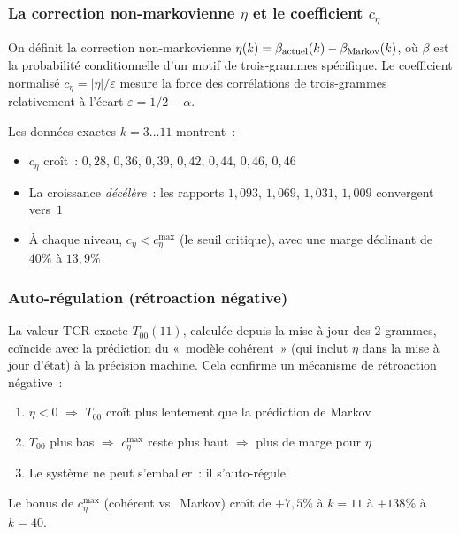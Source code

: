 \documentclass[12pt,a4paper]{article}
\begin{document}
\subsubsection{La correction non-markovienne $\eta$ et le coefficient $c_\eta$}

On définit la correction non-markovienne
$\eta(k) = \beta_{\rm actuel}(k) - \beta_{\rm Markov}(k)$, où
$\beta$ est la probabilité conditionnelle d'un motif de
trois-grammes spécifique. Le coefficient normalisé
$c_\eta = |\eta|/\varepsilon$ mesure la force des corrélations de
trois-grammes relativement à l'écart
$\varepsilon = 1/2 - \alpha$.

Les données exactes $k = 3\ldots 11$ montrent~:
\begin{itemize}[nosep]
\item $c_\eta$ croît~: $0{,}28$, $0{,}36$, $0{,}39$, $0{,}42$,
  $0{,}44$, $0{,}46$, $0{,}46$
\item La croissance \emph{décélère}~: les rapports
  $1{,}093$, $1{,}069$, $1{,}031$, $1{,}009$ convergent vers~$1$
\item À chaque niveau, $c_\eta < c_\eta^{\max}$ (le seuil critique),
  avec une marge déclinant de $40\%$ à $13{,}9\%$
\end{itemize}

\subsubsection{Auto-régulation (rétroaction négative)}
\label{sec:ch7b_auto}

La valeur TCR-exacte $T_{00}(11)$, calculée depuis la mise à jour des
2-grammes, coïncide avec la prédiction du «~modèle cohérent~» (qui
inclut $\eta$ dans la mise à jour d'état) à la précision machine. Cela
confirme un mécanisme de rétroaction négative~:

\begin{enumerate}[nosep]
\item $\eta < 0$ $\Rightarrow$ $T_{00}$ croît plus lentement que la
  prédiction de Markov
\item $T_{00}$ plus bas $\Rightarrow$ $c_\eta^{\max}$ reste plus haut
  $\Rightarrow$ plus de marge pour $\eta$
\item Le système ne peut s'emballer~: il s'auto-régule
\end{enumerate}

Le bonus de $c_\eta^{\max}$ (cohérent vs.\ Markov) croît de $+7{,}5\%$
à $k = 11$ à $+138\%$ à $k = 40$.
\end{document}

